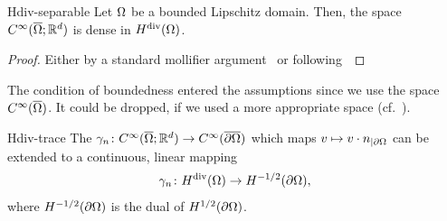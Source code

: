 \begin{Theorem}{Hdiv-separable}
  Let $\Omega$ be a bounded Lipschitz domain. Then, the space
  $C^\infty(\overline{\Omega};\mathbb R^d)$ is dense in $H^{\text{div}}(\Omega)$.
\end{Theorem}

\begin{proof}
  Either by a standard mollifier argument~\cite{AdamsFournier03} or
  following~\cite[Theorem 2.4]{GiraultRaviart86}
\end{proof}

\begin{remark}
  The condition of boundedness entered the assumptions since we use
  the space $C^\infty(\overline{\Omega})$. It could be dropped, if we
  used a more appropriate space (cf.~\cite[Theorem
  2.4]{GiraultRaviart86}).
\end{remark}

\begin{Theorem}{Hdiv-trace}
  The 
  $\gamma_n\colon C^\infty(\overline{\Omega};\mathbb R^d) \to
  C^\infty(\overline{\partial\Omega})$
  which maps $v\mapsto v\cdot n_{|\partial\Omega}$ can be extended to a
  continuous, linear mapping
  \begin{gather}
    \gamma_n\colon H^{\text{div}}(\Omega) \to H^{-1/2}(\partial\Omega),
  \end{gather}
  where $H^{-1/2}(\partial\Omega)$ is the dual of $H^{1/2}(\partial\Omega)$.
\end{Theorem}

